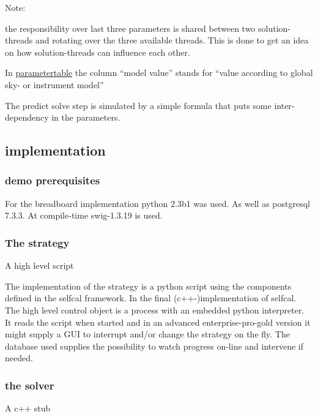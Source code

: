 \documentclass[]{lofar}
\begin{document}
      \begin{em}\large{Note: }

        the responsibility over last three parameters is shared
        between two solution-threads and rotating over the three
        available threads. This is done to get an idea on how
        solution-threads can influence each other.
     
      \end{em}

      In \hyperlink{parametertable}{parametertable} the
      column ``model value'' stands for ``value according to global
      sky- or instrument model''

      The predict solve step is simulated by a simple formula that
      puts some inter-dependency in the parameters.

    \subsection{implementation}
    \label{id2721359}\hypertarget{id2721359}{}%

      \subsubsection{demo prerequisites}
      \label{id2721362}\hypertarget{id2721362}{}%

        For the breadboard implementation python 2.3b1 was used.  As
        well as postgresql 7.3.3.  At compile-time swig-1.3.19 is used.

      \subsubsection{The strategy}
      \label{id2721371}\hypertarget{id2721371}{}%
        A high level script

        The implementation of the strategy is a python script using
        the components defined in the selfcal framework. In the final
        (c++-)implementation of selfcal. The high level control object
        is a process with an embedded python interpreter. It reads the
        script when started and in an advanced enterprise-pro-gold
        version it might supply a GUI to interrupt and/or change the
        strategy on the fly. The database used supplies the
        possibility to watch progress on-line and intervene if needed.

      \subsubsection{the solver}
      \label{id2721390}\hypertarget{id2721390}{}%
        A c++ stub
\end{document}
